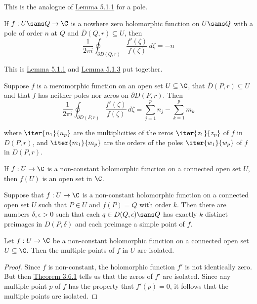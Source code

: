 \label{fb96cf1}

This is the analogue of \href{bfaa6bf}{Lemma 5.1.1} for a pole.

If $f:U\sans Q\to\C$ is a nowhere zero holomorphic function on $U\sans Q$ with
a pole of order $n$ at $Q$ and $\overline D(Q,r)\subseteq U$, then
$$
  \frac1{2\pi i}\oint_{\partial D(Q,r)}\frac{f'(\zeta)}{f(\zeta)}\,d\zeta=-n
$$

\label{b8c772b}

This is \href{bfaa6bf}{Lemma 5.1.1} and \href{fb96cf1}{Lemma 5.1.3} put
together.

Suppose $f$ is a meromorphic function on an open set $U\subseteq\C$, that
$\overline D(P,r)\subseteq U$ and that $f$ has neither poles nor zeros on
$\partial D(P,r)$. Then
$$
  \frac1{2\pi i}\oint_{\partial D(P,r)}\frac{f'(\zeta)}{f(\zeta)}\,d\zeta=
  \sum_{j=1}^pn_j-\sum_{k=1}^pm_k
$$

where $\iter{n_1}{n_p}$ are the multiplicities of the zeros $\iter{z_1}{z_p}$
of $f$ in $D(P,r)$, and $\iter{m_1}{m_p}$ are the orders of the poles
$\iter{w_1}{w_p}$ of $f$ in $D(P,r)$.

\label{e5ecb18}

If $f:U\to\C$ is a non-constant holomorphic function on a connected open set
$U$, then $f(U)$ is an open set in $\C$.

\label{a98fb27}

Suppose that $f:U\to\C$ is a non-constant holomorphic function on a connected
open set $U$ such that $P\in U$ and $f(P)=Q$ with order $k$. Then there are
numbers $\delta,\epsilon>0$ such that each $q\in D(Q,\epsilon)\sans Q$ has
exactly $k$ distinct preimages in $D(P,\delta)$ and each preimage a simple
point of $f$.

\label{ab74e2a}

Let $f:U\to\C$ be a non-constant holomorphic function on a connected open set
$U\subseteq\C$. Then the multiple points of $f$ in $U$ are isolated.

\begin{proof}
  Since $f$ is non-constant, the holomorphic function $f'$ is not identically
  zero. But then \href{bdc2857}{Theorem 3.6.1} tells us that the zeros of $f'$
  are isolated. Since any multiple point $p$ of $f$ has the property that
  $f'(p)=0$, it follows that the multiple points are isolated.
\end{proof}

